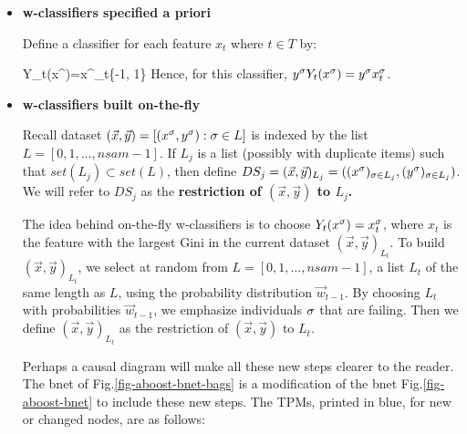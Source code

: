 \begin{itemize}
\item {\bf
w-classifiers specified a priori}

Define a classifier 
for each feature $x_t$ 
where $t\in T$ by:

\beq
Y_t(x^\s)=x^\s_t\in \{-1, 1\}
\eeq
Hence, for this classifier,
$y^\sigma Y_t (x^\sigma)=y^\sigma x_t^\sigma$.

\item {\bf w-classifiers built
on-the-fly}

Recall
dataset
$(\vec{x},\vec{y})=
[(x^\sigma, y^\sigma):\sigma\in L]$
is indexed by the  list
 $L=[0, 1, \ldots, nsam-1]$.
If
$L_j$ is a list (possibly with 
duplicate items)
such that $set(L_j)\subset set(L)$,
 then
define
$DS_j=(\vec{x}, \vec{y})_{L_j}=
((x^\sigma)_{\sigma\in L_j}, 
(y^\sigma)_{\sigma\in L_j})$.
We will
refer to $DS_j$
as the {\bf restriction of 
$(\vec{x}, \vec{y})$ to $L_j$.}

The idea 
behind on-the-fly
w-classifiers is to choose 
$Y_t(x^\sigma)=x_t^\sigma$,
where $x_t$
is the feature with the largest
Gini in
the current dataset
$(\vec{x}, \vec{y})_{L_t}$.
To build 
$(\vec{x}, \vec{y})_{L_t}$,
we select at random 
from $L=[0, 1, \ldots, nsam-1]$,
a list $L_t$
of the same
length as $L$,
using the probability
distribution
$\vec{w}_{t-1}$.
By choosing
$L_t$
with
probabilities $\vec{w}_{t-1}$,
we emphasize 
individuals $\sigma$
that are failing.
Then
we define 
$(\vec{x},\vec{y})_{L_t}$
as the restriction of
$(\vec{x},\vec{y})$
to $L_t$.

Perhaps a causal diagram
will make all these 
new steps clearer
to the reader.
The bnet of 
Fig.\ref{fig-aboost-bnet-bags}
is a modification of the
 bnet
Fig.\ref{fig-aboost-bnet}
to include these new steps.
The TPMs,
printed in blue,
for new or changed nodes, are as 
follows:




\end{itemize}

